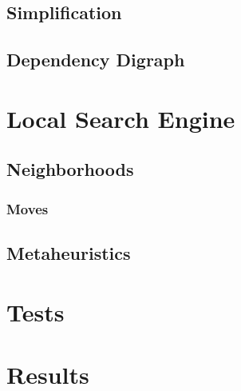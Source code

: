 \documentclass[a4paper,12pt]{article}
\begin{document}
  \subsection{Simplification}
    
  \subsection{Dependency Digraph}
  
\section{Local Search Engine}
  \subsection{Neighborhoods}
    \subsubsection{Moves}
  \subsection{Metaheuristics}
\section{Tests}
\section{Results}
\end{document}
